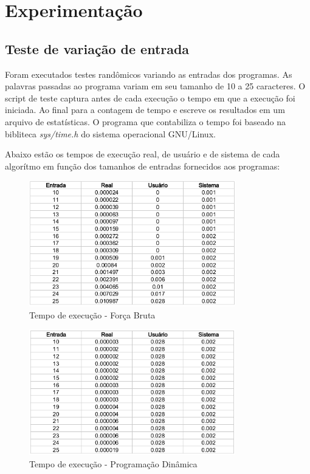 \chapter{Experimentação}

\section{Teste de variação de entrada}

Foram executados testes randômicos variando as entradas dos programas. 
As palavras passadas ao programa variam em seu tamanho de 10 a 25 
caracteres. O script de teste captura antes de cada execução o tempo em
que a execução foi iniciada. Ao final para a contagem de tempo e escreve
os resultados em um arquivo de estatísticas. O programa que contabiliza 
o tempo foi baseado na bibliteca {\it sys/time.h} do sistema operacional 
GNU/Linux.

Abaixo estão os tempos de execução real, de usuário e de sistema 
de cada algorítmo em função dos tamanhos de entradas fornecidos aos 
programas: 

\begin{figure}[H]
    \begin{center}
        \includegraphics[width=0.8\textwidth,natwidth=610,natheight=642]{doc/brute-time-test.png}
        \caption{Tempo de execução - Força Bruta}
        \label{fig:brutetime}
    \end{center}
\end{figure}

\begin{figure}[H]
    \begin{center}
        \includegraphics[width=0.8\textwidth,natwidth=610,natheight=642]{doc/dynamic-time-test.png}
        \caption{Tempo de execução - Programação Dinâmica}
        \label{fig:dynamictime}
    \end{center}
\end{figure}

